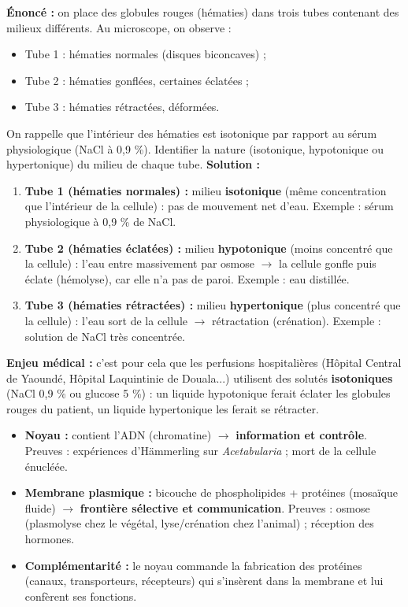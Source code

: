 \documentclass[11pt]{article}
\begin{document}
\begin{exoresolu}
\textbf{Énoncé :} on place des globules rouges (hématies) dans trois tubes contenant des milieux différents. Au microscope, on observe :
\begin{itemize}
    \item Tube 1 : hématies normales (disques biconcaves) ;
    \item Tube 2 : hématies gonflées, certaines éclatées ;
    \item Tube 3 : hématies rétractées, déformées.
\end{itemize}
On rappelle que l'intérieur des hématies est isotonique par rapport au sérum physiologique (NaCl à 0,9 \%). Identifier la nature (isotonique, hypotonique ou hypertonique) du milieu de chaque tube.
\tcblower
\textbf{Solution :}
\begin{enumerate}
    \item \textbf{Tube 1 (hématies normales) :} milieu \textbf{isotonique} (même concentration que l'intérieur de la cellule) : pas de mouvement net d'eau. Exemple : sérum physiologique à 0,9 \% de NaCl.
    \item \textbf{Tube 2 (hématies éclatées) :} milieu \textbf{hypotonique} (moins concentré que la cellule) : l'eau entre massivement par osmose $\rightarrow$ la cellule gonfle puis éclate (hémolyse), car elle n'a pas de paroi. Exemple : eau distillée.
    \item \textbf{Tube 3 (hématies rétractées) :} milieu \textbf{hypertonique} (plus concentré que la cellule) : l'eau sort de la cellule $\rightarrow$ rétractation (crénation). Exemple : solution de NaCl très concentrée.
\end{enumerate}
\textbf{Enjeu médical :} c'est pour cela que les perfusions hospitalières (Hôpital Central de Yaoundé, Hôpital Laquintinie de Douala...) utilisent des solutés \textbf{isotoniques} (NaCl 0,9 \% ou glucose 5 \%) : un liquide hypotonique ferait éclater les globules rouges du patient, un liquide hypertonique les ferait se rétracter.
\end{exoresolu}

\begin{aretenir}
\begin{itemize}
    \item \textbf{Noyau :} contient l'ADN (chromatine) $\rightarrow$ \textbf{information et contrôle}. Preuves : expériences d'Hämmerling sur \textit{Acetabularia} ; mort de la cellule énucléée.
    \item \textbf{Membrane plasmique :} bicouche de phospholipides + protéines (mosaïque fluide) $\rightarrow$ \textbf{frontière sélective et communication}. Preuves : osmose (plasmolyse chez le végétal, lyse/crénation chez l'animal) ; réception des hormones.
    \item \textbf{Complémentarité :} le noyau commande la fabrication des protéines (canaux, transporteurs, récepteurs) qui s'insèrent dans la membrane et lui confèrent ses fonctions.
\end{itemize}
\end{aretenir}
\end{document}
